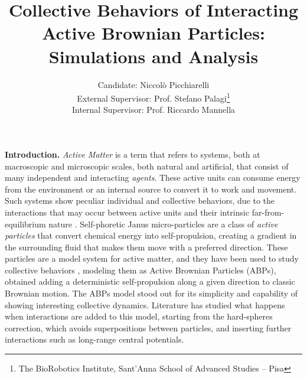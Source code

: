 \documentclass[a4paper, notitlepage]{report} %
\title{Collective Behaviors of Interacting Active Brownian Particles: Simulations and Analysis}
\author{Candidate: Niccolò Picchiarelli \\
External Supervisor: Prof. Stefano Palagi\footnote{The BioRobotics Institute, Sant'Anna School of Advanced Studies -- Pisa}\\
Internal Supervisor: Prof. Riccardo Mannella}
\begin{document}
	\maketitle
	\textbf{Introduction.}
	\emph{Active Matter} is a term that refers to systems, both at macroscopic and microscopic scales, both natural and artificial, that consist of many independent and interacting \emph{agents}. 
	These active units can consume energy from the environment or an internal source to convert it to work and movement. 
	Such systems show peculiar individual and collective behaviors, due to the interactions that may occur between active units and their intrinsic far-from-equilibrium nature \cite{menon_active_2010, ramaswamy_active_2017}.
	Self-phoretic Janus micro-particles are a class of \emph{active particles} that convert chemical energy into self-propulsion, creating a gradient in the surrounding fluid that makes them move with a preferred direction.
	These particles are a model system for active matter, and they have been used to study collective behaviors \cite{bechinger_active_2016}, modeling them as Active Brownian Particles (ABPs), obtained adding a deterministic self-propulsion along a given direction to classic Brownian motion.
	The ABPs model stood out for its simplicity and capability of showing interesting collective dynamics.
	Literature has studied what happens when interactions are added to this model, starting from the hard-spheres correction, which avoids superpositions between particles, and inserting further interactions such as long-range central potentials.
	
	
\end{document}
